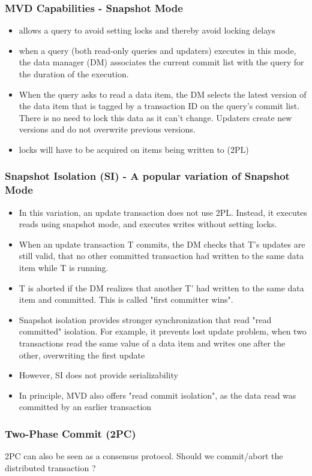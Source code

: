\documentclass[12]{beamer}
\begin{document}
\begin{frame}
\frametitle{MVD Capabilities - Snapshot Mode}
\begin{itemize}
\item allows a query to avoid setting locks and thereby avoid locking delays
\item when a query (both read-only queries and updaters) executes in this mode, the data manager (DM) associates the current commit list with the query for the duration of the execution.
\item When the query asks to read a data item, the DM selects the latest version of the data item that is tagged by a transaction ID on the query's commit list. There is no need to lock this data as it can't change. Updaters create new versions and do not overwrite previous versions.
\item locks will have to be acquired on items being written to (2PL)
\end{itemize}
\end{frame}

\begin{frame}
\frametitle{Snapshot Isolation (SI) - A popular variation of Snapshot Mode}
\begin{itemize}
\item In this variation, an update transaction does not use 2PL. Instead, it executes reads using snapshot mode, and executes writes without setting locks.
\item When an update transaction T commits, the DM checks that T's updates are still valid, that no other committed transaction had written to the same data item while T is running.
\item T is aborted if the DM realizes that another T' had written to the same data item and committed. This is called "first committer wins".
\item Snapshot isolation provides stronger synchronization that read "read committed" isolation. For example, it prevents lost update problem, when two transactions read the same value of a data item and writes one after the other, overwriting the first update
\item However, SI does not provide serializability
\item In principle, MVD also offers "read commit isolation", as the data read was committed by an earlier transaction
\end{itemize}
\end{frame}

\begin{frame}
\frametitle{Two-Phase Commit (2PC)}
2PC can also be seen as a consensus protocol. Should we commit/abort the distributed transaction ?
\end{frame}
\end{document}
